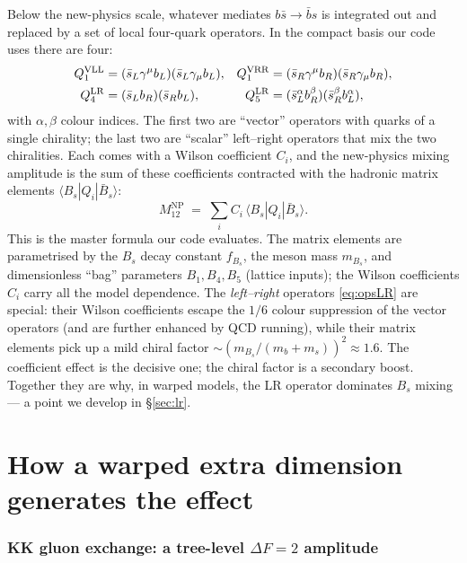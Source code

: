 \documentclass[11pt]{article}
\newcommand{\Bs}{B_s}
\newcommand{\Bsbar}{\bar B_s}
\newcommand{\MtwelveNP}{M_{12}^{\mathrm{NP}}}
\theoremstyle{definition}
\begin{document}
Below the new-physics scale, whatever mediates $b\bar s \to \bar b s$ is
integrated out and replaced by a set of local four-quark operators. In the
compact basis our code uses there are four:
\begin{align}
Q_1^{\rm VLL} &= (\bar s_L \gamma^\mu b_L)(\bar s_L \gamma_\mu b_L), &
Q_1^{\rm VRR} &= (\bar s_R \gamma^\mu b_R)(\bar s_R \gamma_\mu b_R),
\label{eq:opsVLL}\\
Q_4^{\rm LR} &= (\bar s_L b_R)(\bar s_R b_L), &
Q_5^{\rm LR} &= (\bar s_L^\alpha b_R^\beta)(\bar s_R^\beta b_L^\alpha),
\label{eq:opsLR}
\end{align}
with $\alpha,\beta$ colour indices. The first two are ``vector'' operators with
quarks of a single chirality; the last two are ``scalar'' left--right operators
that mix the two chiralities. Each comes with a Wilson coefficient $C_i$, and the
new-physics mixing amplitude is the sum of these coefficients contracted with the
hadronic matrix elements $\langle \Bs|Q_i|\Bsbar\rangle$:
\begin{equation}
\MtwelveNP \;=\; \sum_i C_i\,\langle \Bs | Q_i | \Bsbar\rangle .
\label{eq:M12sum}
\end{equation}
This is the master formula our code evaluates. The matrix elements are
parametrised by the $\Bs$ decay constant $f_{\Bs}$, the meson mass $m_{\Bs}$, and
dimensionless ``bag'' parameters $B_1,B_4,B_5$ (lattice inputs); the Wilson
coefficients $C_i$ carry all the model dependence. The \emph{left--right}
operators \eqref{eq:opsLR} are special: their Wilson coefficients escape the
$1/6$ colour suppression of the vector operators (and are further enhanced by
QCD running), while their matrix elements pick up a mild chiral factor
$\sim (m_{\Bs}/(m_b+m_s))^2 \approx 1.6$. The coefficient effect is the decisive
one; the chiral factor is a secondary boost. Together they are why, in warped
models, the LR operator dominates $\Bs$ mixing --- a point we develop in
\S\ref{sec:lr}.

\part{How a warped extra dimension generates the effect}
\label{part:rs}

\section{KK gluon exchange: a tree-level $\Delta F=2$ amplitude}
\label{sec:kkgluon}
\end{document}
